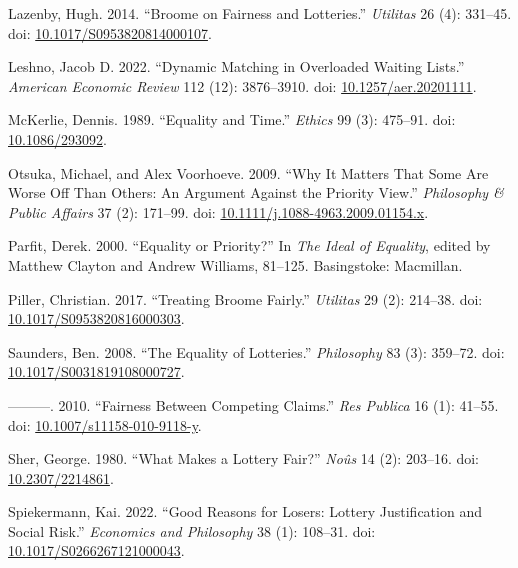 \documentclass[
  11pt,
  letterpaper,
  DIV=11,
  numbers=noendperiod,
  twoside]{scrartcl}
\newlength{\cslhangindent}
\newenvironment{CSLReferences}[2] %
 {\begin{list}{}{%
  \setlength{\itemindent}{0pt}
  \setlength{\leftmargin}{0pt}
  \setlength{\parsep}{0pt}
  \ifodd #1
   \setlength{\leftmargin}{\cslhangindent}
   \setlength{\itemindent}{-1\cslhangindent}
  \fi
  \setlength{\itemsep}{#2\baselineskip}}}
 {\end{list}}
\begin{document}
\begin{CSLReferences}{1}{0}
Lazenby, Hugh. 2014. {``Broome on Fairness and Lotteries.''}
\emph{Utilitas} 26 (4): 331--45. doi:
\href{https://doi.org/10.1017/S0953820814000107}{10.1017/S0953820814000107}.

Leshno, Jacob D. 2022. {``Dynamic Matching in Overloaded Waiting
Lists.''} \emph{American Economic Review} 112 (12): 3876--3910. doi:
\href{https://doi.org/10.1257/aer.20201111}{10.1257/aer.20201111}.

McKerlie, Dennis. 1989. {``Equality and Time.''} \emph{Ethics} 99 (3):
475--91. doi: \href{https://doi.org/10.1086/293092}{10.1086/293092}.

Otsuka, Michael, and Alex Voorhoeve. 2009. {``Why It Matters That Some
Are Worse Off Than Others: An Argument Against the Priority View.''}
\emph{Philosophy \& Public Affairs} 37 (2): 171--99. doi:
\href{https://doi.org/10.1111/j.1088-4963.2009.01154.x}{10.1111/j.1088-4963.2009.01154.x}.

Parfit, Derek. 2000. {``Equality or Priority?''} In \emph{The Ideal of
Equality}, edited by Matthew Clayton and Andrew Williams, 81--125.
Basingstoke: Macmillan.

Piller, Christian. 2017. {``Treating Broome Fairly.''} \emph{Utilitas}
29 (2): 214--38. doi:
\href{https://doi.org/10.1017/S0953820816000303}{10.1017/S0953820816000303}.

Saunders, Ben. 2008. {``The Equality of Lotteries.''} \emph{Philosophy}
83 (3): 359--72. doi:
\href{https://doi.org/10.1017/S0031819108000727}{10.1017/S0031819108000727}.

---------. 2010. {``Fairness Between Competing Claims.''} \emph{Res
Publica} 16 (1): 41--55. doi:
\href{https://doi.org/10.1007/s11158-010-9118-y}{10.1007/s11158-010-9118-y}.

Sher, George. 1980. {``What Makes a Lottery Fair?''} \emph{No{û}s} 14
(2): 203--16. doi:
\href{https://doi.org/10.2307/2214861}{10.2307/2214861}.

Spiekermann, Kai. 2022. {``Good Reasons for Losers: Lottery
Justification and Social Risk.''} \emph{Economics and Philosophy} 38
(1): 108--31. doi:
\href{https://doi.org/10.1017/S0266267121000043}{10.1017/S0266267121000043}.


\end{CSLReferences}
\end{document}
